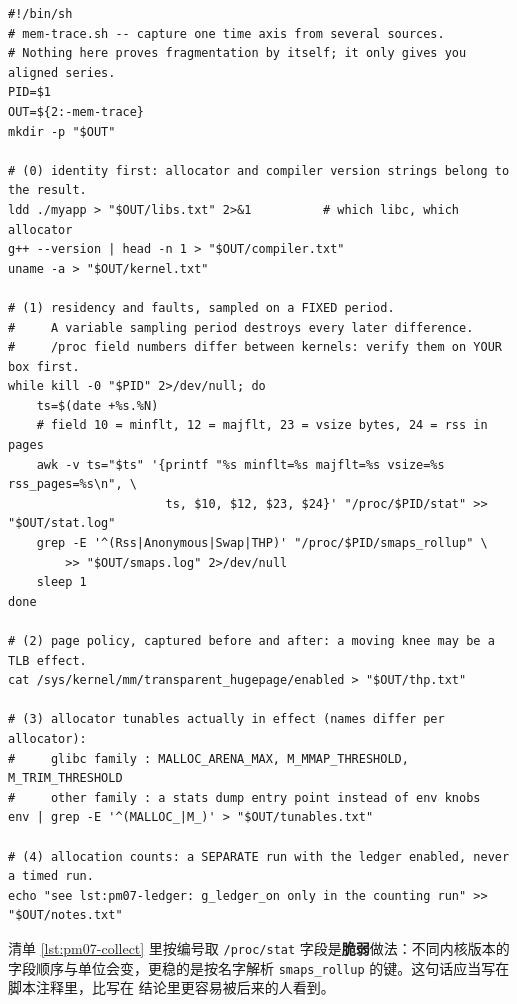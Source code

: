 \documentclass[12pt,a4paper,fontset=fandol]{ctexbook}
\newcommand{\Tp}[1]{\texttt{#1}}
\newcommand{\Bk}{\discretionary{}{}{}}
\begin{document}
\begin{lstlisting}[style=shellstyle, caption={内存侧时序采集清单：在同一时间轴上取驻留、缺页与分配器状态}, label={lst:pm07-collect}]
#!/bin/sh
# mem-trace.sh -- capture one time axis from several sources.
# Nothing here proves fragmentation by itself; it only gives you aligned series.
PID=$1
OUT=${2:-mem-trace}
mkdir -p "$OUT"

# (0) identity first: allocator and compiler version strings belong to the result.
ldd ./myapp > "$OUT/libs.txt" 2>&1          # which libc, which allocator
g++ --version | head -n 1 > "$OUT/compiler.txt"
uname -a > "$OUT/kernel.txt"

# (1) residency and faults, sampled on a FIXED period.
#     A variable sampling period destroys every later difference.
#     /proc field numbers differ between kernels: verify them on YOUR box first.
while kill -0 "$PID" 2>/dev/null; do
    ts=$(date +%s.%N)
    # field 10 = minflt, 12 = majflt, 23 = vsize bytes, 24 = rss in pages
    awk -v ts="$ts" '{printf "%s minflt=%s majflt=%s vsize=%s rss_pages=%s\n", \
                      ts, $10, $12, $23, $24}' "/proc/$PID/stat" >> "$OUT/stat.log"
    grep -E '^(Rss|Anonymous|Swap|THP)' "/proc/$PID/smaps_rollup" \
        >> "$OUT/smaps.log" 2>/dev/null
    sleep 1
done

# (2) page policy, captured before and after: a moving knee may be a TLB effect.
cat /sys/kernel/mm/transparent_hugepage/enabled > "$OUT/thp.txt"

# (3) allocator tunables actually in effect (names differ per allocator):
#     glibc family : MALLOC_ARENA_MAX, M_MMAP_THRESHOLD, M_TRIM_THRESHOLD
#     other family : a stats dump entry point instead of env knobs
env | grep -E '^(MALLOC_|M_)' > "$OUT/tunables.txt"

# (4) allocation counts: a SEPARATE run with the ledger enabled, never a timed run.
echo "see lst:pm07-ledger: g_ledger_on only in the counting run" >> "$OUT/notes.txt"
\end{lstlisting}

清单 \ref{lst:pm07-collect} 里按编号取 \Tp{/proc/{\Bk}stat} 字段是\textbf{脆弱}做法：不同内核版本的
字段顺序与单位会变，更稳的是按名字解析 \Tp{smaps{\Bk}\_rollup} 的键。这句话应当写在脚本注释里，比写在
结论里更容易被后来的人看到。
\end{document}
